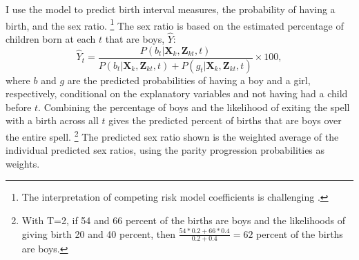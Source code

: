 \documentclass[12pt,letterpaper]{article}
\begin{document}
% 


I use the model to predict birth interval measures, the probability of having a birth, 
and the sex ratio.%
\footnote{
The interpretation of competing risk model coefficients is challenging \citep{thomas96}.
}
The sex ratio is based on the estimated percentage of children born at each $t$ that are 
boys, $\hat{Y}$:  
\begin{equation}
\hat{Y}_t 
= 
\frac{ P(b_{t} | \mathbf{X}_{k}, \mathbf{Z}_{kt},t )}
{ P(b_{t} | \mathbf{X}_{k}, \mathbf{Z}_{kt},t) + P(g_{t} | \mathbf{X}_{k}, \mathbf{Z}_{kt},t )} 
\times 100,
\label{eq:probability_son}
\end{equation}
where $b$ and $g$ are the predicted probabilities of having a boy and a girl, respectively,
conditional on the explanatory variables and not having had a child before $t$.
Combining the percentage of boys and the likelihood of exiting the spell with a birth
across all $t$ gives the predicted percent of births that are boys over the entire spell.%
\footnote{
With T=2, if 54 and 66 percent of the births are boys and the likelihoods of 
giving birth 20 and 40 percent, then $\frac{54*0.2+66*0.4}{0.2+0.4} = 62$ percent of the
births are boys.
}
The predicted sex ratio shown is the weighted average of the individual predicted sex 
ratios, using the parity progression probabilities as weights.
\end{document}
